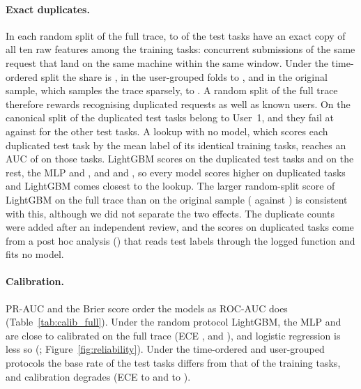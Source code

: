 \paragraph{Exact duplicates.} In each random split of the full trace,  to  of the test tasks have an exact copy of all ten raw features among the training tasks: concurrent submissions of the same request that land on the same machine within the same window. Under the time-ordered split the share is , in the user-grouped folds  to , and in the original sample, which samples the trace sparsely,  to . A random split of the full trace therefore rewards recognising duplicated requests as well as known users. On the canonical split  of the duplicated test tasks belong to User~1, and they fail at  against  for the other test tasks. A lookup with no model, which scores each duplicated test task by the mean label of its identical training tasks, reaches an AUC of  on those tasks. LightGBM scores  on the duplicated test tasks and  on the rest, the MLP  and , and \kaam{}  and , so every model scores higher on duplicated tasks and LightGBM comes closest to the lookup. The larger random-split score of LightGBM on the full trace than on the original sample ( against ) is consistent with this, although we did not separate the two effects. The duplicate counts were added after an independent review, and the scores on duplicated tasks come from a post hoc analysis () that reads test labels through the logged function and fits no model.

\paragraph{Calibration.} PR-AUC and the Brier score order the models as ROC-AUC does (Table~\ref{tab:calib_full}). Under the random protocol LightGBM, the MLP and \kaam{} are close to calibrated on the full trace (ECE ,  and ), and logistic regression is less so (; Figure~\ref{fig:reliability}). Under the time-ordered and user-grouped protocols the base rate of the test tasks differs from that of the training tasks, and calibration degrades (ECE  to  and  to ).

